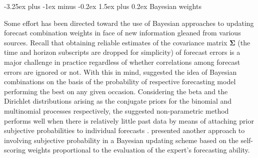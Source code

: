 \documentclass[11pt]{article}
\makeatletter
\renewcommand{\paragraph}{\@startsection{paragraph}{4}{0ex}%
   {-3.25ex plus -1ex minus -0.2ex}%
   {1.5ex plus 0.2ex}%
   {\normalfont\normalsize\bfseries}}
\makeatother
\begin{document}
\paragraph{Bayesian weights}

Some effort has been directed toward the use of Bayesian approaches to updating forecast combination weights in face of new information gleaned from various sources. Recall that obtaining reliable estimates of the covariance matrix $\boldsymbol{\Sigma}$ (the time and horizon subscripts are dropped for simplicity) of forecast errors is a major challenge in practice regardless of whether correlations among forecast errors are ignored or not. With this in mind, \citet{Bunn1975-vz} suggested the idea of Bayesian combinations on the basis of the probability of respective forecasting model performing the best on any given occasion. Considering the beta and the Dirichlet distributions arising as the conjugate priors for the binomial and multinomial processes respectively, the suggested non-parametric method performs well when there is relatively little past data by means of attaching prior subjective probabilities to individual forecasts \citep{Bunn1985-vo,De_Menezes2000-vd}. \citet{Oller1978-wx} presented another approach to involving subjective probability in a Bayesian updating scheme based on the self-scoring weights proportional to the evaluation of the expert's forecasting ability.
\end{document}
